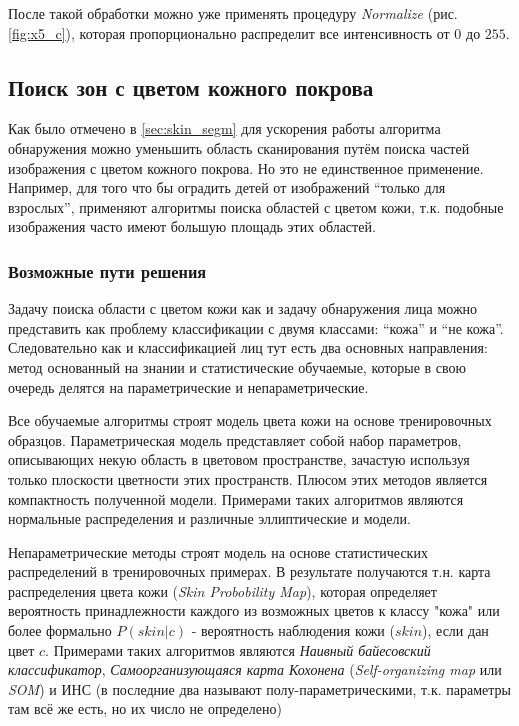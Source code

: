 \documentclass[12pt]{report}
\begin{document}
\begin{figure}[h]
	\centering
	\caption{}
	\label{fig:aggresive_normal_steps}
\end{figure}

После такой обработки можно уже применять процедуру \textit{Normalize} (рис. \ref{fig:x5_c}), которая пропорционально 
распределит все интенсивность от $0$ до $255$.

\subsection{Поиск зон с цветом кожного покрова}
\label{sec:skin_detection}
Как было отмечено в \ref{sec:skin_segm} для ускорения работы алгоритма обнаружения можно уменьшить область 
сканирования путём поиска частей изображения с цветом кожного покрова. Но это не единственное применение. Например, 
для того что бы оградить детей от изображений ``только для взрослых'', применяют алгоритмы поиска областей с цветом 
кожи, т.к. подобные изображения часто имеют большую площадь этих областей. \citep{forsyth1999automatic} \citep
{zheng2004blocking}

\subsubsection{Возможные пути решения}
Задачу поиска области с цветом кожи как и задачу обнаружения лица можно представить как проблему классификации с 
двумя классами: ``кожа'' и ``не кожа''. Следовательно как и классификацией лиц тут есть два основных направления: 
метод основанный на знании и статистические обучаемые, которые в свою очередь делятся на параметрические и 
непараметрические. \citep{vezhnevets2003survey}

Все обучаемые алгоритмы строят модель цвета кожи на основе тренировочных образцов. Параметрическая модель 
представляет собой набор параметров, описывающих некую область в цветовом пространстве, зачастую используя только 
плоскости цветности этих пространств. Плюсом этих методов является компактность полученной модели. Примерами таких 
алгоритмов являются нормальные распределения и различные эллиптические и модели.

Непараметрические методы строят модель на основе статистических распределений в тренировочных примерах. В результате 
получаются т.н. карта распределения цвета кожи (\textit{Skin Probobility Map}), которая определяет вероятность 
принадлежности каждого из возможных цветов к классу "кожа" или более формально $P(skin|c)$ - вероятность наблюдения 
кожи ($skin$), если дан цвет $c$. Примерами таких алгоритмов являются \emph{Наивный байесовский классификатор}, \emph
{Самоорганизующаяся карта Кохонена} (\textit{Self-organizing map} или \textit{SOM}) и ИНС (в \citep{xu2006color} 
последние два называют полу-параметрическими, т.к. параметры там всё же есть, но их число не определено)
\end{document}
